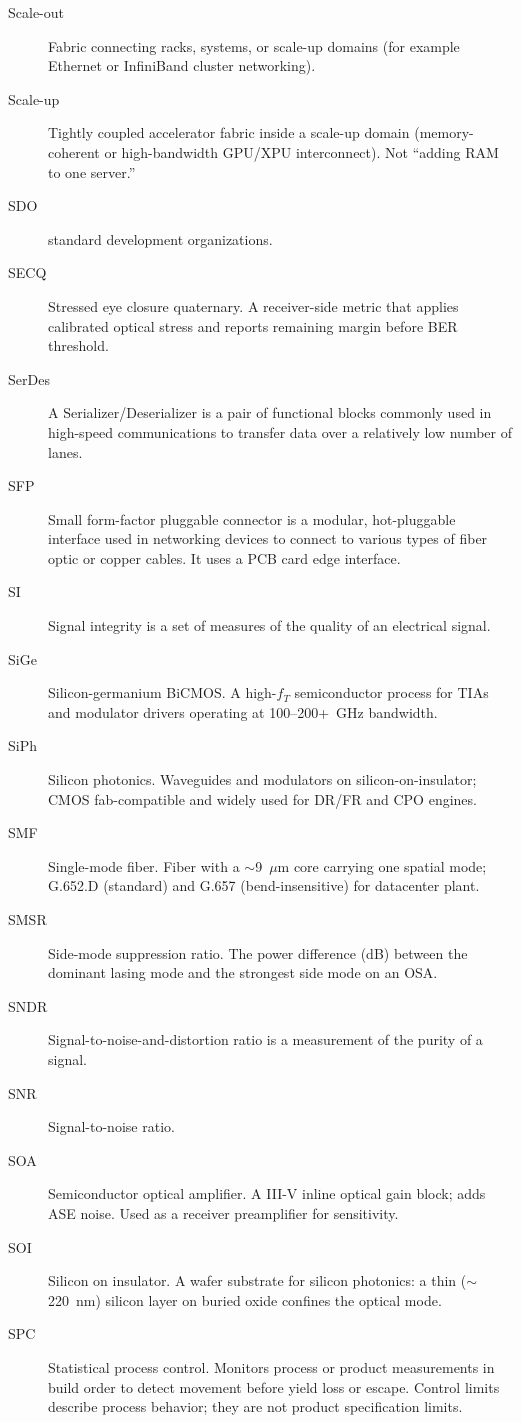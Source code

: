 \begin{description}
\item[Scale-out] Fabric connecting racks, systems, or scale-up domains (for example Ethernet or InfiniBand cluster networking).
\item[Scale-up] Tightly coupled accelerator fabric inside a scale-up domain (memory-coherent or high-bandwidth GPU/XPU interconnect). Not ``adding RAM to one server.''
\item[SDO] standard development organizations.
\item[SECQ] Stressed eye closure quaternary. A receiver-side metric that applies calibrated optical stress and reports remaining margin before BER threshold.
\item[SerDes] A Serializer/Deserializer is a pair of functional blocks commonly used in high-speed communications to transfer data over a relatively low number of lanes.
\item[SFP] Small form-factor pluggable connector is a modular, hot-pluggable interface used in networking devices to connect to various types of fiber optic or copper cables. It uses a PCB card edge interface.
\item[SI] Signal integrity is a set of measures of the quality of an electrical signal.
\item[SiGe] Silicon-germanium BiCMOS. A high-$f_T$ semiconductor process for TIAs and modulator drivers operating at 100--200+~GHz bandwidth.
\item[SiPh] Silicon photonics. Waveguides and modulators on silicon-on-insulator; CMOS fab-compatible and widely used for DR/FR and CPO engines.
\item[SMF] Single-mode fiber. Fiber with a $\sim$9~$\mu$m core carrying one spatial mode; G.652.D (standard) and G.657 (bend-insensitive) for datacenter plant.
\item[SMSR] Side-mode suppression ratio. The power difference (dB) between the dominant lasing mode and the strongest side mode on an OSA.
\item[SNDR] Signal-to-noise-and-distortion ratio is a measurement of the purity of a signal.
\item[SNR] Signal-to-noise ratio.
\item[SOA] Semiconductor optical amplifier. A III-V inline optical gain block; adds ASE noise. Used as a receiver preamplifier for sensitivity.
\item[SOI] Silicon on insulator. A wafer substrate for silicon photonics: a thin ($\sim$220~nm) silicon layer on buried oxide confines the optical mode.
\item[SPC] Statistical process control. Monitors process or product measurements in build order to detect movement before yield loss or escape. Control limits describe process behavior; they are not product specification limits.

\end{description}
